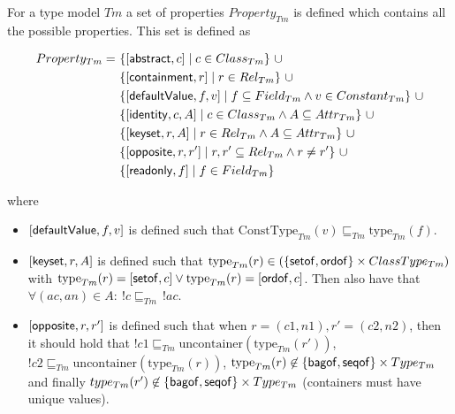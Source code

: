 \begin{defin}
\label{defin:formalisations:ecore_formalisation:type_models:type_model_properties}
For a type model $Tm$ a set of properties $Property_{Tm}$ is defined which contains all the possible properties. This set is defined as 

\begin{align*}
    Property_{Tm} =\ &
    \{[ \mathsf{abstract}, c ] \mid c \in Class_{Tm} \}\ \cup \\&
    \{[ \mathsf{containment}, r ] \mid r \in Rel_{Tm} \}\ \cup \\&
    \{[ \mathsf{defaultValue}, f, v ] \mid f \subseteq Field_{Tm} \land v \in Constant_{Tm} \}\ \cup \\&
    \{[ \mathsf{identity}, c, A ] \mid c \in Class_{Tm} \land A \subseteq Attr_{Tm} \}\ \cup \\&
    \{[ \mathsf{keyset}, r, A ] \mid r \in Rel_{Tm} \land A \subseteq Attr_{Tm} \}\ \cup \\&
    \{[ \mathsf{opposite}, r, r' ] \mid r, r' \subseteq Rel_{Tm} \land r \not= r'\}\ \cup \\&
    \{[ \mathsf{readonly}, f ] \mid f \in Field_{Tm} \}
\end{align*}

where
\begin{itemize}
    \item $[ \mathsf{defaultValue}, f, v ]$ is defined such that $\mathrm{ConstType}_{Tm}(v) \sqsubseteq_{Tm} \mathrm{type}_{Tm}(f)$.
    \item $[ \mathsf{keyset}, r, A ]$ is defined such that $\mathrm{type}_{Tm}(r) \in (\{ \mathsf{setof}, \mathsf{ordof} \} \times ClassType_{Tm})$ with $\mathrm{type}_{Tm}(r) = [\mathsf{setof}, c] \lor \mathrm{type}_{Tm}(r) = [ \mathsf{ordof}, c ]$. Then also have that $\forall ( ac, an ) \in A\!:\: !c\sqsubseteq_{Tm}\,!ac$.
    \item $[ \mathsf{opposite}, r, r' ]$ is defined such that when $r = ( c1, n1 ), r' = ( c2, n2 )$, then it should hold that $!c1 \sqsubseteq_{Tm} \mathrm{uncontainer}(\mathrm{type}_{Tm}(r'))$, $!c2 \sqsubseteq_{Tm} \mathrm{uncontainer}(\mathrm{type}_{Tm}(r))$, $\mathrm{type}_{Tm}(r) \not\in \{ \mathsf{bagof}, \mathsf{seqof} \} \times Type_{Tm}$ and finally $type_{Tm}(r') \not\in \{ \mathsf{bagof}, \mathsf{seqof} \} \times Type_{Tm}$ (containers must have unique values).
\end{itemize}

\end{defin}

